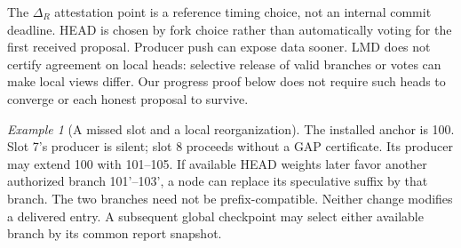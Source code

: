 \documentclass[11pt,a4paper,onecolumn]{article}
\theoremstyle{remark}\newtheorem{example}[definition]{Example}
\begin{document}
The $\Delta_R$ attestation point is a reference timing choice, not an internal
commit deadline. HEAD is chosen by fork choice rather than automatically voting
for the first received proposal. Producer push can expose data sooner.
LMD does not certify agreement on local heads: selective release of valid
branches or votes can make local views differ. Our progress proof below does
not require such heads to converge or each honest proposal to survive.

\begin{example}[A missed slot and a local reorganization]
The installed anchor is 100. Slot 7's producer is silent; slot 8 proceeds
without a GAP certificate. Its producer may extend 100 with 101--105.
If available HEAD weights later favor another authorized branch
101'--103', a node can replace its speculative suffix by that branch.
The two branches need not be prefix-compatible. Neither change modifies a
delivered entry. A subsequent global checkpoint may select either available
branch by its common report snapshot.
\end{example}

\end{document}
